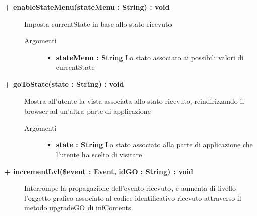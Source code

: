 \begin{description}
	\begin{description}
		\item[\textbf{\color{blue}+ enableStateMenu(stateMenu : String) : void		}] \hfill
			Imposta currentState in base allo stato ricevuto
			
		\begin{description}
			\item[Argomenti] \hfill
				\begin{itemize}
				
					\item \textbf{stateMenu : String		} \hfill
					Lo stato associato ai possibili valori di currentState
					
				\end{itemize}
			
		\end{description}
	\end{description}
	
	\begin{description}
		\item[\textbf{\color{blue} + goToState(state : String) : void		}] \hfill
			Mostra all'utente la vista associata allo stato ricevuto, reindirizzando il browser ad un'altra parte di applicazione
			
		\begin{description}
			\item[Argomenti] \hfill
				\begin{itemize}
				
					\item \textbf{state : String		} \hfill
					Lo stato associato alla parte di applicazione che l'utente ha scelto di visitare
					
				\end{itemize}
			
		\end{description}
	\end{description}
	
	\begin{description}
		\item[\textbf{\color{blue} + incrementLvl(\$event : Event, idGO : String) : void		}] \hfill
			Interrompe la propagazione dell'evento ricevuto, e aumenta di livello l'oggetto grafico associato al codice identificativo ricevuto attraverso il metodo upgradeGO di infContents
			

\end{description}
\end{description}
